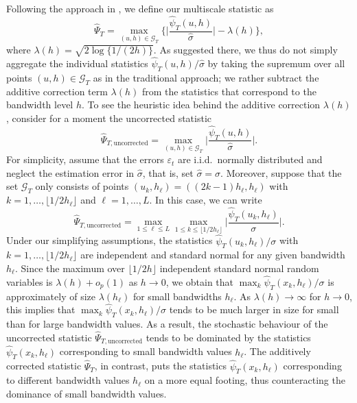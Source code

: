 \documentclass[a4paper,12pt]{article}
\numberwithin{equation}{section}
\begin{document}
Following the approach in \cite{DuembgenSpokoiny2001}, we define our multiscale statistic as 
\[ \widehat{\Psi}_T = \max_{(u,h) \in \mathcal{G}_T} \Big\{ \Big|\frac{\widehat{\psi}_T(u,h)}{\widehat{\sigma}}\Big| - \lambda(h) \Big\}, \] 
where $\lambda(h) = \sqrt{2 \log \{ 1/(2h) \}}$. As suggested there, we thus do not simply aggregate the individual statistics $\widehat{\psi}_T(u,h)/\widehat{\sigma}$ by taking the supremum over all points $(u,h) \in \mathcal{G}_T$ as in the traditional approach; we rather subtract the additive correction term $\lambda(h)$ from the statistics that correspond to the bandwidth level $h$. To see the heuristic idea behind the additive correction $\lambda(h)$, consider for a moment the uncorrected statistic
\[ \widehat{\Psi}_{T,\text{uncorrected}} = \max_{(u,h) \in \mathcal{G}_T} \Big|\frac{\widehat{\psi}_T(u,h)}{\widehat{\sigma}}\Big|. \]
For simplicity, assume that the errors $\varepsilon_t$ are i.i.d.\ normally distributed and neglect the estimation error in $\widehat{\sigma}$, that is, set $\widehat{\sigma} = \sigma$. Moreover, suppose that the set $\mathcal{G}_T$ only consists of points $(u_k,h_\ell) = ((2k - 1)h_\ell,h_\ell)$ with $k = 1,\ldots,\lfloor 1/2h_\ell \rfloor$ and $\ell = 1,\ldots,L$. In this case, we can write
\[ \widehat{\Psi}_{T,\text{uncorrected}} = \max_{1 \le \ell \le L} \max_{1 \le k \le \lfloor 1/2h_\ell \rfloor} \Big|\frac{\widehat{\psi}_T(u_k,h_\ell)}{\sigma}\Big|. \]
Under our simplifying assumptions, the statistics $\widehat{\psi}_T(u_k,h_\ell)/\sigma$ with $k = 1,\ldots,\lfloor 1/2h_\ell \rfloor$ are independent and standard normal for any given bandwidth $h_\ell$. Since the maximum over $\lfloor 1/2h \rfloor$ independent standard normal random variables is $\lambda(h) + o_p(1)$ as $h \rightarrow 0$, we obtain that $\max_{k} \widehat{\psi}_T(x_k,h_\ell)/\sigma$ is approximately of size $\lambda(h_\ell)$ for small bandwidths $h_\ell$. As $\lambda(h) \rightarrow \infty$ for $h \rightarrow 0$, this implies that $\max_{k} \widehat{\psi}_T(x_k,h_\ell)/\sigma$ tends to be much larger in size for small than for large bandwidth values. As a result, the stochastic behaviour of the uncorrected statistic $\widehat{\Psi}_{T,\text{uncorrected}}$ tends to be dominated by the statistics $\widehat{\psi}_T(x_k,h_\ell)$ corresponding to small bandwidth values $h_\ell$. The additively corrected statistic $\widehat{\Psi}_T$, in contrast, puts the statistics $\widehat{\psi}_T(x_k,h_\ell)$ corresponding to different bandwidth values $h_\ell$ on a more equal footing, thus counteracting the dominance of small bandwidth values. 
\end{document}
